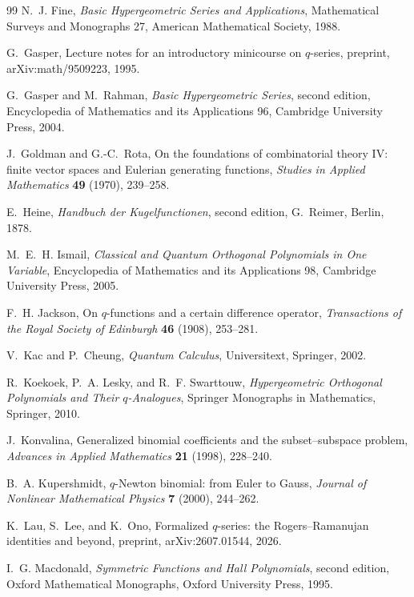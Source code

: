 \documentclass[11pt,oneside,openany]{book}
\theoremstyle{definition}
\theoremstyle{remark}
\begin{document}
\begin{thebibliography}{99}
N.~J. Fine,
\emph{Basic Hypergeometric Series and Applications},
Mathematical Surveys and Monographs 27, American Mathematical Society, 1988.

G.~Gasper,
Lecture notes for an introductory minicourse on $q$-series,
preprint, arXiv:math/9509223, 1995.

G.~Gasper and M.~Rahman,
\emph{Basic Hypergeometric Series}, second edition,
Encyclopedia of Mathematics and its Applications 96, Cambridge University Press, 2004.

J.~Goldman and G.-C.~Rota,
On the foundations of combinatorial theory IV: finite vector spaces and Eulerian generating functions,
\emph{Studies in Applied Mathematics} \textbf{49} (1970), 239--258.

E.~Heine,
\emph{Handbuch der Kugelfunctionen}, second edition,
G.~Reimer, Berlin, 1878.

M.~E.~H. Ismail,
\emph{Classical and Quantum Orthogonal Polynomials in One Variable},
Encyclopedia of Mathematics and its Applications 98, Cambridge University Press, 2005.

F.~H. Jackson,
On $q$-functions and a certain difference operator,
\emph{Transactions of the Royal Society of Edinburgh} \textbf{46} (1908), 253--281.

V.~Kac and P.~Cheung,
\emph{Quantum Calculus},
Universitext, Springer, 2002.

R.~Koekoek, P.~A. Lesky, and R.~F. Swarttouw,
\emph{Hypergeometric Orthogonal Polynomials and Their $q$-Analogues},
Springer Monographs in Mathematics, Springer, 2010.

J.~Konvalina,
Generalized binomial coefficients and the subset--subspace problem,
\emph{Advances in Applied Mathematics} \textbf{21} (1998), 228--240.

B.~A. Kupershmidt,
$q$-Newton binomial: from Euler to Gauss,
\emph{Journal of Nonlinear Mathematical Physics} \textbf{7} (2000), 244--262.

K.~Lau, S.~Lee, and K.~Ono,
Formalized $q$-series: the Rogers--Ramanujan identities and beyond,
preprint, arXiv:2607.01544, 2026.

I.~G. Macdonald,
\emph{Symmetric Functions and Hall Polynomials}, second edition,
Oxford Mathematical Monographs, Oxford University Press, 1995.


\end{thebibliography}
\end{document}
